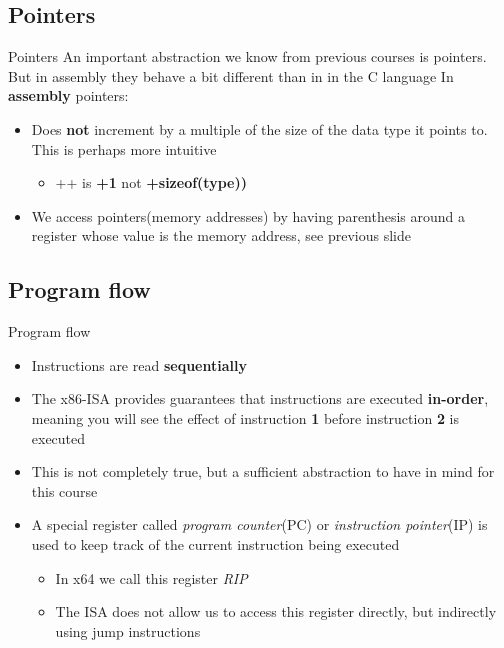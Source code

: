 \documentclass[
	11pt, %
	aspectratio=169, %
]{beamer}
\begin{document}
\subsection{Pointers}
\begin{frame}{Pointers}{\sectiontitle}
    An important abstraction we know from previous courses is pointers. But in assembly they behave a bit different than in in the C language
    In \textbf{assembly} pointers:
    \begin{itemize}
        \item Does \textbf{not} increment by a multiple of the size of the data type it points to. This is perhaps more intuitive
              \begin{itemize}
                  \item ++ is \textbf{+1} not \textbf{+sizeof(type))}
              \end{itemize}
        \item We access pointers(memory addresses) by having parenthesis around a register whose value is the memory address, see previous slide
    \end{itemize}
\end{frame}

\subsection{Program flow}
\begin{frame}{Program flow}{\sectiontitle}
    \begin{itemize}
        \item Instructions are read \textbf{sequentially}
        \item The x86-ISA provides guarantees that instructions are executed \textbf{in-order}, meaning you will see the effect of instruction \textbf{1} before instruction \textbf{2} is executed
        \item This is not completely true, but a sufficient abstraction to have in mind for this course
        \item A special register called \textit{program counter}(PC) or \textit{instruction pointer}(IP) is used to keep track of the current instruction being executed
              \begin{itemize}
                  \item In x64 we call this register \textit{RIP}
                  \item The ISA does not allow us to access this register directly, but indirectly using jump instructions
              \end{itemize}
    \end{itemize}
\end{frame}
\end{document}
